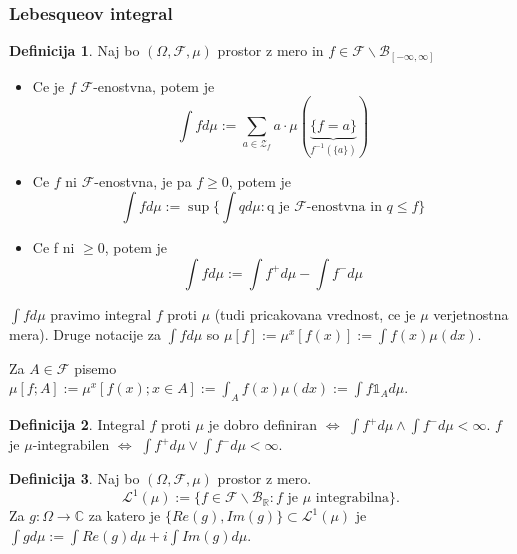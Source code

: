 \documentclass[a4paper,12pt]{article}
\theoremstyle{definition} %
\newtheorem{definicija}{Definicija}[section]
\theoremstyle{plain} %
\newcommand{\R}{\mathbb{R}}
\newcommand{\F}{\mathcal{F}}
\begin{document}
        \subsubsection{Lebesqueov integral}
            \begin{definicija}
                Naj bo $(\Omega, \F, \mu)$ prostor z mero in $f \in \F\backslash\mathcal{B}_{[-\infty, \infty]}$
                \begin{itemize}
                    \item Ce je $f$ $\F$-enostvna, potem je
                    $$
                        \int fd\mu := \sum_{a \in \mathcal{Z}_f}a\cdot\mu(\underbrace{\{f = a\}}_{f^{-1}(\{a\})})
                    $$
                    \item Ce $f$ ni $\F$-enostvna, je pa $f \geq 0$, potem je
                    $$
                        \int fd\mu := \sup\{\int qd\mu: \text{q je $\F$-enostvna in $q  \leq f$}\}
                    $$
                    \item Ce f ni $\geq 0$, potem je 
                    $$
                        \int fd\mu := \int f^+d\mu - \int f^-d\mu
                    $$
                \end{itemize}
                $\int fd\mu$ pravimo integral $f$ proti $\mu$ (tudi pricakovana vrednost, ce je $\mu$ verjetnostna mera).
                Druge notacije za $\int fd\mu$ so $\mu[f]:=\mu^x[f(x)]:=\int f(x)\mu(dx).$
            \end{definicija}

            Za $A \in \F$ pisemo $\mu[f;A]:= \mu^x[f(x);x \in A]:= \int_A f(x)\mu(dx):= \int f\mathds{1}_Ad\mu$.

            \begin{definicija}
                Integral $f$ proti $\mu$ je dobro definiran $\iff$ $\int f^+d\mu \wedge\int f^-d\mu < \infty$.
                $f$ je $\mu$-integrabilen $\iff $ $\int f^+d\mu \vee \int f^-d\mu < \infty$.
            \end{definicija}

            \begin{definicija}
                Naj bo $(\Omega, \F, \mu)$ prostor z mero. 
                $$
                    \mathcal{L}^1(\mu) := \{f \in \F\backslash\mathcal{B}_{\R}: \text{$f$ je $\mu$ integrabilna}\}. 
                $$
                Za $g:\Omega \rightarrow \mathbb{C}$ za katero je $\{Re(g), Im(g)\} \subset \mathcal{L}^1(\mu)$ je 
                $\int g d\mu:= \int Re(g)d\mu + i\int Im(g)d\mu$.
            \end{definicija}
\end{document}
